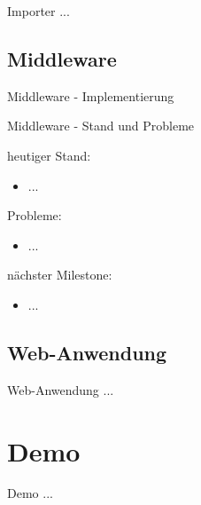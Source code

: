 \documentclass[9pt]{beamer}
\begin{document}
\begin{frame}{Importer}{}
	...
\end{frame}

\subsection{Middleware}

\begin{frame}{Middleware - Implementierung}{}
	\begin{center}
	\end{center}
\end{frame}

\begin{frame}{Middleware - Stand und Probleme}{}

	heutiger Stand:
	\begin{itemize}
		\item ...
	\end{itemize}

	Probleme:
	\begin{itemize}
		\item ...
	\end{itemize}
	
	nächster Milestone:
	\begin{itemize}
		\item ...
	\end{itemize}

\end{frame}

\subsection{Web-Anwendung}

\begin{frame}{Web-Anwendung}{}
	...
\end{frame}

\section{Demo}

\begin{frame}{Demo}{}
	...
\end{frame}
\end{document}
